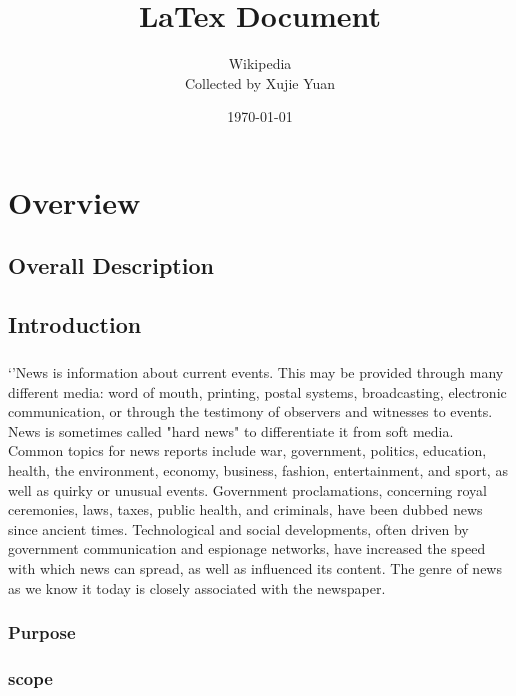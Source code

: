 \documentclass{book}
\title{LaTex Document}
\author{Wikipedia \\ Collected by Xujie Yuan}
\date{\today}
\begin{document}
    \maketitle
    \tableofcontents
    \chapter{Overview}
    \section{Overall Description}

    \section{Introduction}
    \paragraph{}
    `'News is information about current events. 
    This may be provided through many different media: 
    word of mouth, printing, postal systems, broadcasting, 
    electronic communication, or through the testimony of 
    observers and witnesses to events. News is sometimes called 
    "hard news" to differentiate it from soft media. Common topics 
    for news reports include war, government, politics, education, 
    health, the environment, economy, business, fashion, 
    entertainment, and sport, as well as quirky or unusual events. 
    Government proclamations, concerning royal ceremonies, laws, taxes, 
    public health, and criminals, 
    have been dubbed news since ancient times. Technological and 
    social developments, often driven by government communication 
    and espionage networks, have increased the speed with which news 
    can spread, as well as influenced its content. The genre of 
    news as we know it today is closely associated with the newspaper.
    \subsection{Purpose}

    \subsection{scope}
\end{document}
